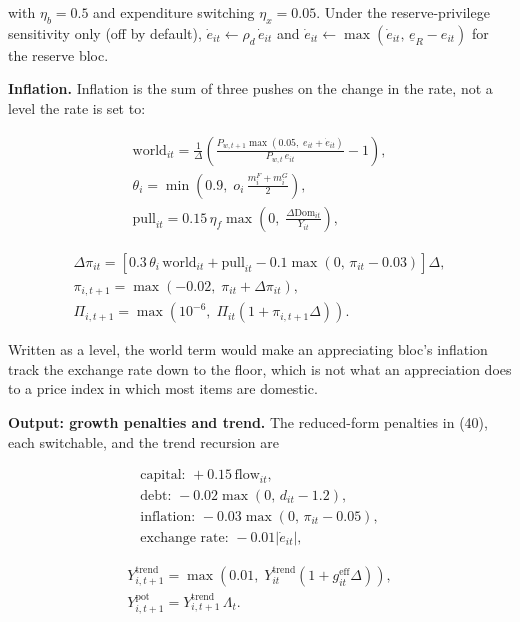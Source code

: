 \documentclass[preprint,review,12pt]{elsarticle}
\begin{document}
with \(\eta_b = 0.5\) and expenditure switching \(\eta_x = 0.05\). Under
the reserve-privilege sensitivity only (off by default),
\(\dot{e}_{it} \leftarrow \rho_d \, \dot{e}_{it}\) and
\(\dot{e}_{it} \leftarrow \max(\dot{e}_{it},\, \underline{e}_R - e_{it})\)
for the reserve bloc.

\textbf{Inflation.} Inflation is the sum of three pushes on the change
in the rate, not a level the rate is set to:

\[\begin{gathered} \mathrm{world}_{it} = \frac{1}{\Delta} \left( \frac{P_{w,t+1} \max\left( 0.05,\; e_{it} + \dot{e}_{it} \right)}{P_{w,t} \, e_{it}} - 1 \right), \\ \theta_i = \min\left( 0.9,\; o_i \, \frac{m^F_i + m^G_i}{2} \right), \\ \mathrm{pull}_{it} = 0.15 \, \eta_f \max\left( 0,\; \frac{\Delta \mathrm{Dom}_{it}}{Y_{it}} \right), \end{gathered}\]

\[\begin{gathered} \Delta \pi_{it} = \left[ 0.3 \, \theta_i \, \mathrm{world}_{it} + \mathrm{pull}_{it} - 0.1 \max(0,\, \pi_{it} - 0.03) \right] \Delta, \\ \pi_{i,t+1} = \max\left( -0.02,\; \pi_{it} + \Delta \pi_{it} \right), \\ \Pi_{i,t+1} = \max\left( 10^{-6},\; \Pi_{it} (1 + \pi_{i,t+1} \Delta) \right). \end{gathered} \tag{B.7}\]

Written as a level, the world term would make an appreciating bloc's
inflation track the exchange rate down to the floor, which is not what
an appreciation does to a price index in which most items are domestic.

\textbf{Output: growth penalties and trend.} The reduced-form penalties
in (40), each switchable, and the trend recursion are

\[\begin{gathered} \text{capital: } +0.15\,\mathrm{flow}_{it}, \\ \text{debt: } -0.02 \max(0,\, d_{it} - 1.2), \\ \text{inflation: } -0.03 \max(0,\, \pi_{it} - 0.05), \\ \text{exchange rate: } -0.01 \left| \dot{e}_{it} \right|, \end{gathered}\]

\[\begin{gathered} Y^{\mathrm{trend}}_{i,t+1} = \max\left( 0.01,\; Y^{\mathrm{trend}}_{it} \left( 1 + g^{\mathrm{eff}}_{it} \Delta \right) \right), \\ Y^{\mathrm{pot}}_{i,t+1} = Y^{\mathrm{trend}}_{i,t+1} \, \Lambda_t. \end{gathered} \tag{B.8}\]
\end{document}

